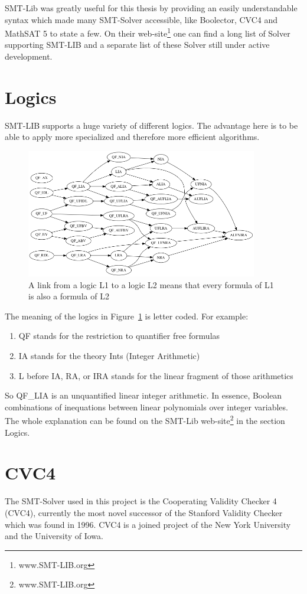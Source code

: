 SMT-Lib was greatly useful for this thesis by providing an easily understandable syntax which made many SMT-Solver accessible, like Boolector, CVC4 and MathSAT 5 to state a few. On their web-site\footnote{www.SMT-LIB.org} one can find a long list of Solver supporting SMT-LIB and a separate list of these Solver still under active development.

\section{Logics}
SMT-LIB supports a huge variety of different logics. The advantage here is to be able to apply more specialized and therefore more efficient algorithms.
\begin{figure}
  \centering
  \includegraphics[width=0.9\textwidth]{Pictures/logics.png}  
  \caption{A link from a logic L1 to a logic L2 means that every formula of L1 is also a formula of L2}
  \label{fig:logics}
\end{figure}
The meaning of the logics in Figure~\ref{fig:logics} is letter coded. For example:
\begin{enumerate}
  \item QF stands for the restriction to quantifier free formulas
  \item IA stands for the theory Ints (Integer Arithmetic)
  \item L before IA, RA, or IRA stands for the linear fragment of those arithmetics 
\end{enumerate}
So QF\_LIA is an unquantified linear integer arithmetic. In essence, Boolean combinations of inequations between linear polynomials over integer variables.
The whole explanation can be found on the SMT-Lib web-site\footnote{www.SMT-LIB.org} in the section Logics.

\section{CVC4}
The SMT-Solver used in this project is the Cooperating Validity Checker 4 (CVC4), currently the most novel  successor of the Stanford Validity Checker which was found in 1996. CVC4 is a joined project of the New York University and the University of Iowa.

